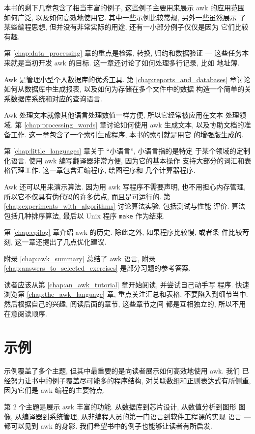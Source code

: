 本书的剩下几章包含了相当丰富的例子, 这些例子主要用来展示 awk 的应用范围
如何广泛, 以及如何高效地使用它. 其中一些示例比较常规, 另外一些虽然展示
了某些编程思想, 但并没有非常实际的用途, 还有一小部分例子仅仅是因为
它们比较有趣.

第 \ref{chap:data_processing} 章的重点是检索, 转换, 归约和数据验证  ---
这些任务本来就是当初开发 awk 的目标. 这一章还讨论了如何处理多行记录, 比如
地址薄.

Awk 是管理小型个人数据库的优秀工具. 第 \ref{chap:reports_and_databases}
章讨论如何从数据库中生成报表, 以及如何为存储在多个文件中的数据
构造一个简单的关系数据库系统和对应的查询语言.

Awk 处理文本就像其他语言处理数值一样方便, 所以它经常被应用在文本
处理领域. 第 \ref{chap:processing_words} 章讨论如何使用 awk 生成文本,
以及协助文档的准备工作. 这一章包含了一个索引生成程序, 本书的索引就是用它
的增强版生成的.

第 \ref{chap:little_languages} 章关于 ``小语言'', 小语言指的是特定
于某个领域的定制化语言. 使用 awk 编写翻译器非常方便, 因为它的基本操作
支持大部分的词汇和表格管理工作. 这一章包含汇编程序, 绘图程序和
几个计算器程序.

Awk 还可以用来演示算法. 因为用 awk 写程序不需要声明, 也不用担心内存管理,
所以它不仅具有伪代码的许多优点, 而且是可运行的. 第
\ref{chap:experiments_with_algorithms} 讨论算法实验, 包括测试与性能
评价. 算法包括几种排序算法, 最后以 Unix 程序 \texttt{make} 作为结束.

第 \ref{chap:epilog} 章介绍 awk 的历史. 除此之外, 如果程序比较慢, 或者条
件比较苛刻, 这一章还提出了几点优化建议.

附录 \ref{chap:awk_summary} 总结了 awk 语言, 附录
\ref{chap:answers_to_selected_exercises} 是部分习题的参考答案.

读者应该从第 \ref{chap:an_awk_tutorial} 章开始阅读, 并尝试自己动手写
程序. 快速浏览第 \ref{chap:the_awk_language} 章, 重点关注汇总和表格,
不要陷入到细节当中. 然后根据自己的兴趣, 阅读后面的章节, 这些章节之间
都是互相独立的, 所以不用在意阅读顺序.
\section*{示例}
示例覆盖了多个主题, 但其中最重要的是向读者展示如何高效地使用 awk. 我们
已经努力让书中的例子覆盖尽可能多的程序结构, 对关联数组和正则表达式有所侧重,
因为它们是 awk 编程的主要特点.

第 2 个主题是展示 awk 丰富的功能. 从数据库到芯片设计, 从数值分析到图形
图像, 从编译器到系统管理, 从非编程人员的第一门语言到软件工程课的实现
语言 --- 都可以见到 awk 的身影. 我们希望书中的例子也能够让读者有所启发.

